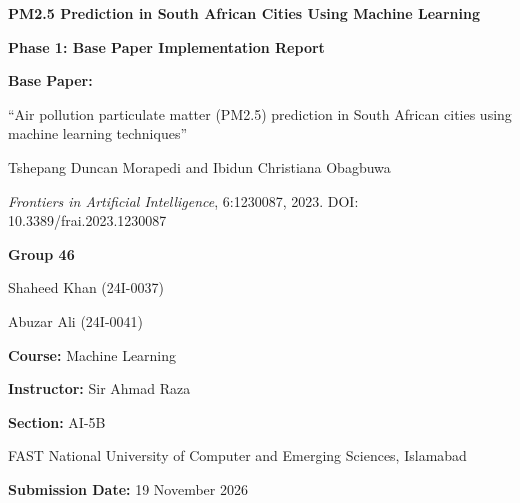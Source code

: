 \documentclass[11pt,a4paper]{article}
\begin{document}
\begin{titlepage}
    \centering
    \vspace*{2.5cm}
    
    {\LARGE \bfseries PM2.5 Prediction in South African Cities Using Machine Learning\par}
    \vspace{0.4cm}
    {\large \bfseries Phase 1: Base Paper Implementation Report\par}
    
    \vspace{1.8cm}
    
    {\textbf{Base Paper:}\par}
    \vspace{0.2cm}
    {``Air pollution particulate matter (PM2.5) prediction in South African cities using machine learning techniques''\par}
    {Tshepang Duncan Morapedi and Ibidun Christiana Obagbuwa\par}
    {\textit{Frontiers in Artificial Intelligence}, 6:1230087, 2023. DOI: 10.3389/frai.2023.1230087\par}
    
    \vspace{2.0cm}
    
    {\textbf{Group 46}\par}
    \vspace{0.3cm}
    {Shaheed Khan (24I-0037)\par}
    {Abuzar Ali (24I-0041)\par}
    
    \vspace{1.5cm}
    
    {\textbf{Course:} Machine Learning\par}
    {\textbf{Instructor:} Sir Ahmad Raza\par}
    {\textbf{Section:} AI-5B\par}
    {FAST National University of Computer and Emerging Sciences, Islamabad\par}
    
    \vspace{1.5cm}
    
    {\textbf{Submission Date:} 19 November 2026\par}
    
    \vfill
\end{titlepage}

\newpage
\setcounter{page}{1}













\end{document}
